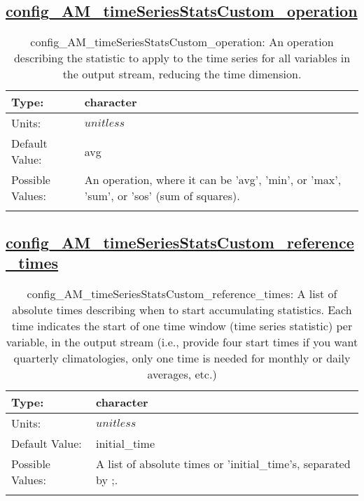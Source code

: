 \subsection[config\_AM\_timeSeriesStatsCustom\_operation]{\hyperref[sec:nm_tab_AM_timeSeriesStatsCustom]{config\_AM\_timeSeriesStatsCustom\_operation}}
\label{subsec:nm_sec_config_AM_timeSeriesStatsCustom_operation}
\begin{center}
\begin{longtable}{| p{2.0in} || p{4.0in} |}
    \hline
    Type: & character \\
    \hline
    Units: & $unitless$ \\
    \hline
    Default Value: & avg \\
    \hline
    Possible Values: & An operation, where it can be 'avg', 'min', or 'max', 'sum', or 'sos' (sum of squares). \\
    \hline
    \caption{config\_AM\_timeSeriesStatsCustom\_operation: An operation describing the statistic to apply to the time series for all variables in the output stream, reducing the time dimension.}
\end{longtable}
\end{center}
\subsection[config\_AM\_timeSeriesStatsCustom\_reference\_times]{\hyperref[sec:nm_tab_AM_timeSeriesStatsCustom]{config\_AM\_timeSeriesStatsCustom\_reference\_times}}
\label{subsec:nm_sec_config_AM_timeSeriesStatsCustom_reference_times}
\begin{center}
\begin{longtable}{| p{2.0in} || p{4.0in} |}
    \hline
    Type: & character \\
    \hline
    Units: & $unitless$ \\
    \hline
    Default Value: & initial\_time \\
    \hline
    Possible Values: & A list of absolute times or 'initial\_time's, separated by ;. \\
    \hline
    \caption{config\_AM\_timeSeriesStatsCustom\_reference\_times: A list of absolute times describing when to start accumulating statistics. Each time indicates the start of one time window (time series statistic) per variable, in the output stream (i.e., provide four start times if you want quarterly climatologies, only one time is needed for monthly or daily averages, etc.)}
\end{longtable}
\end{center}
